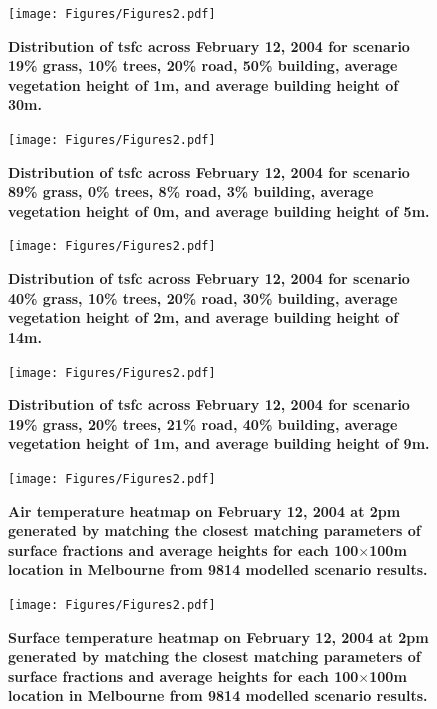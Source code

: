 \documentclass[final,3p,times,authoryear]{elsarticle}
\begin{document}
\begin{figure}
\centering
\texttt{[image: Figures/Figures2.pdf]}
\caption{\bf Distribution of \gls{tsfc} across February 12, 2004 for scenario 19\% grass, 10\% trees, 20\% road, 50\% building, average vegetation height of 1m, and average building height of 30m.}
 \label{fig:dist}
\end{figure}


\begin{figure}
\centering
\texttt{[image: Figures/Figures2.pdf]}
\caption{\bf Distribution of \gls{tsfc} across February 12, 2004 for scenario 89\% grass, 0\% trees, 8\% road, 3\% building, average vegetation height of 0m, and average building height of 5m.}
 \label{fig:dist}
\end{figure}


\begin{figure}
\centering
\texttt{[image: Figures/Figures2.pdf]}
\caption{\bf Distribution of \gls{tsfc} across February 12, 2004 for scenario 40\% grass, 10\% trees, 20\% road, 30\% building, average vegetation height of 2m, and average building height of 14m.}
 \label{fig:dist}
\end{figure}

\begin{figure}
\centering
\texttt{[image: Figures/Figures2.pdf]}
\caption{\bf Distribution of \gls{tsfc} across February 12, 2004 for scenario 19\% grass, 20\% trees, 21\% road, 40\% building, average vegetation height of 1m, and average building height of 9m.}
 \label{fig:dist}
\end{figure}


\begin{figure}
\centering
\texttt{[image: Figures/Figures2.pdf]}
\caption{\bf Air temperature heatmap on February 12, 2004 at 2pm generated by matching the closest matching parameters of surface fractions and average heights for each 100$\times$100m location in Melbourne from 9814 modelled scenario results.  }
 \label{fig:dist}
\end{figure}

\begin{figure}
\centering
\texttt{[image: Figures/Figures2.pdf]}
\caption{\bf Surface temperature heatmap on February 12, 2004 at 2pm generated by matching the closest matching parameters of surface fractions and average heights for each 100$\times$100m location in Melbourne from 9814 modelled scenario results.  }
 \label{fig:dist}
\end{figure}
\end{document}
